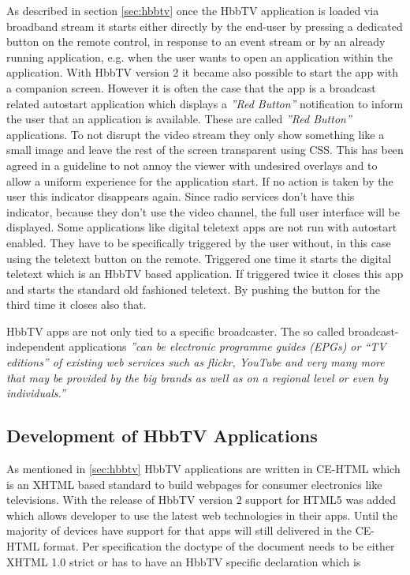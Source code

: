 As described in section \ref{sec:hbbtv} once the HbbTV application is loaded via broadband stream
it starts either directly by the end-user by pressing a dedicated button on the remote control, in
response to an event stream or by an already running application, e.g. when the user wants to open
an application within the application. With HbbTV version 2 it became also possible to start the
app with a companion screen. However it is often the case that the app is a broadcast related
autostart application which displays a \textit{''Red Button''} notification to inform the user
that an application is available. These are called \textit{''Red Button''} applications. To not
disrupt the video stream they only show something like a small image and leave the rest of the
screen transparent using CSS. This has been agreed in a guideline to not annoy the viewer with
undesired overlays and to allow a uniform experience for the application start. If no action
is taken by the user this indicator disappears again. Since radio services don't have this
indicator, because they don't use the video channel, the full user interface will be displayed.
Some applications like digital teletext apps are not run with autostart enabled. They have
to be specifically triggered by the user without, in this case using the teletext button on
the remote. Triggered one time it starts the digital teletext which is an HbbTV based application.
If triggered twice it closes this app and starts the standard old fashioned teletext. By pushing
the button for the third time it closes also that.

HbbTV apps are not only tied to a specific broadcaster. The so called broadcast-independent
applications \textit{''can be electronic programme guides (EPGs) or “TV editions” of existing
web services such as flickr, YouTube and very many more that may be provided by the big brands
as well as on a regional level or even by individuals.''}\cite{biapps}

\subsection{Development of HbbTV Applications\label{sec:devofhbbtv}}

As mentioned in \ref{sec:hbbtv} HbbTV applications are written in CE-HTML which is an XHTML
based standard to build webpages for consumer electronics like televisions. With the release
of HbbTV version 2 support for HTML5 was added which allows developer to use the latest
web technologies in their apps. Until the majority of devices have support for that apps will
still delivered in the CE-HTML format. Per specification the doctype of the document needs
to be either XHTML 1.0 strict or has to have an HbbTV specific declaration which is

